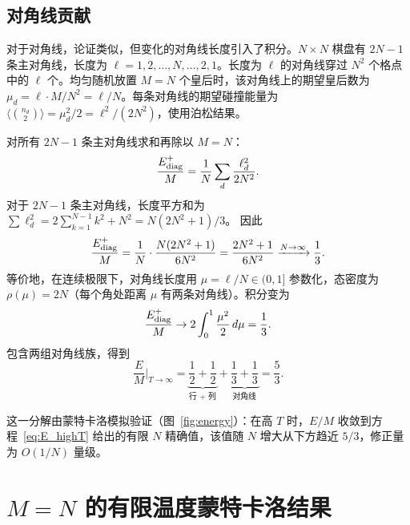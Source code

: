 \documentclass[aps, pre, reprint, amsmath, amssymb, superscriptaddress, floatfix]{revtex4-2}
\begin{document}
\subsection{对角线贡献}

对于对角线，论证类似，但变化的对角线长度引入了积分。$N \times N$ 棋盘有 $2N - 1$ 条主对角线，长度为 $\ell = 1, 2, \ldots, N, \ldots, 2, 1$。长度为 $\ell$ 的对角线穿过 $N^2$ 个格点中的 $\ell$ 个。均匀随机放置 $M = N$ 个皇后时，该对角线上的期望皇后数为 $\mu_d = \ell \cdot M/N^2 = \ell/N$。每条对角线的期望碰撞能量为 $\langle\binom{n_d}{2}\rangle = \mu_d^2/2 = \ell^2/(2N^2)$，使用泊松结果。

对所有 $2N - 1$ 条主对角线求和再除以 $M = N$：
\begin{equation}
  \frac{E_{\rm diag}^+}{M} = \frac{1}{N} \sum_{d}
  \frac{\ell_d^2}{2N^2}.
  \label{eq:E_diag_sum}
\end{equation}
对于 $2N - 1$ 条主对角线，长度平方和为
$\sum \ell_d^2 = 2\sum_{k=1}^{N-1} k^2 + N^2 = N(2N^2+1)/3$。
因此
\begin{equation}
  \frac{E_{\rm diag}^+}{M}
  = \frac{1}{N} \cdot \frac{N(2N^2+1)}{6N^2}
  = \frac{2N^2+1}{6N^2}
  \xrightarrow{N \to \infty} \frac{1}{3}.
  \label{eq:E_diag_exact}
\end{equation}
等价地，在连续极限下，对角线长度用 $\mu = \ell/N \in (0, 1]$ 参数化，态密度为 $\rho(\mu) = 2N$（每个角处距离 $\mu$ 有两条对角线）。积分变为
\begin{equation}
  \frac{E_{\rm diag}^+}{M}
  \to 2\int_0^1 \frac{\mu^2}{2}\,d\mu = \frac{1}{3}.
  \label{eq:E_diag}
\end{equation}
包含两组对角线族，得到
\begin{equation}
  \frac{E}{M}\bigg|_{T \to \infty}
  = \underbrace{\frac{1}{2} + \frac{1}{2}}_{\text{行 + 列}}
  + \underbrace{\frac{1}{3} + \frac{1}{3}}_{\text{对角线}}
  = \frac{5}{3}.
  \label{eq:53}
\end{equation}

这一分解由蒙特卡洛模拟验证（图~\ref{fig:energy}）：在高 $T$ 时，$E/M$ 收敛到方程~\eqref{eq:E_highT} 给出的有限 $N$ 精确值，该值随 $N$ 增大从下方趋近 $5/3$，修正量为 $O(1/N)$ 量级。


\section{\texorpdfstring{$M = N$}{M=N} 的有限温度蒙特卡洛结果}
\label{sec:mc}
\end{document}
